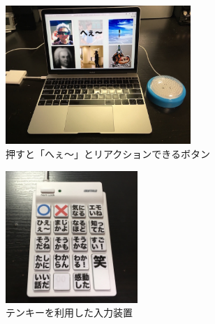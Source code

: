 \begin{figure}[h]
\centering
\includegraphics[width=7cm]{images/heebutton.png}
\caption{押すと「へぇ〜」とリアクションできるボタン}
\label{heebutton}
\end{figure}

\begin{figure}[h]
\centering
\includegraphics[width=5cm]{images/10key.png}
\caption{テンキーを利用した入力装置}
\label{10key}
\end{figure}